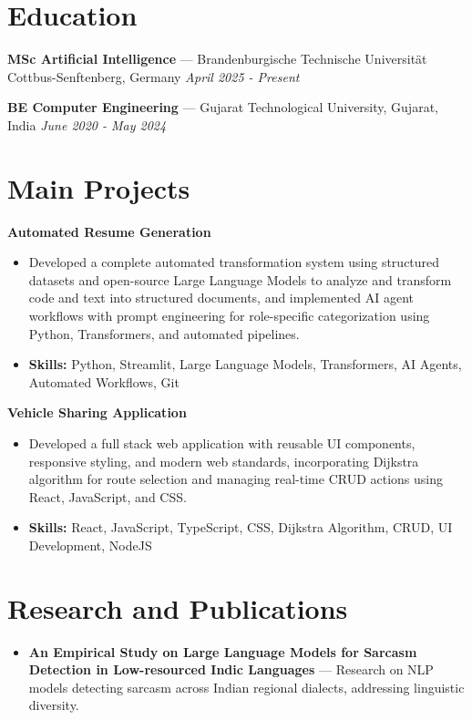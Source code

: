 \documentclass[a4paper,10pt]{article}
\begin{document}
\section*{Education}
\textbf{MSc Artificial Intelligence} — Brandenburgische Technische Universität Cottbus-Senftenberg, Germany \hfill \textit{April 2025 - Present}\par
\vspace{1.5pt}
\textbf{BE Computer Engineering} — Gujarat Technological University, Gujarat, India \hfill \textit{June 2020 - May 2024}\par

\section*{Main Projects}
\textbf{Automated Resume Generation}\par
\vspace{1pt}
\begin{itemize}
  \item Developed a complete automated transformation system using structured datasets and open-source Large Language Models to analyze and transform code and text into structured documents, and implemented AI agent workflows with prompt engineering for role-specific categorization using Python, Transformers, and automated pipelines.
  \item \textbf{Skills:} Python, Streamlit, Large Language Models, Transformers, AI Agents, Automated Workflows, Git
\end{itemize}
\vspace{3pt}
\textbf{Vehicle Sharing Application}\par
\vspace{1pt}
\begin{itemize}
  \item Developed a full stack web application with reusable UI components, responsive styling, and modern web standards, incorporating Dijkstra algorithm for route selection and managing real-time CRUD actions using React, JavaScript, and CSS.
  \item \textbf{Skills:} React, JavaScript, TypeScript, CSS, Dijkstra Algorithm, CRUD, UI Development, NodeJS
\end{itemize}

\section*{Research and Publications}
\begin{itemize}
\item \textbf{An Empirical Study on Large Language Models for Sarcasm Detection in Low-resourced Indic Languages} — Research on NLP models detecting sarcasm across Indian regional dialects, addressing linguistic diversity.
\end{itemize}
\end{document}
